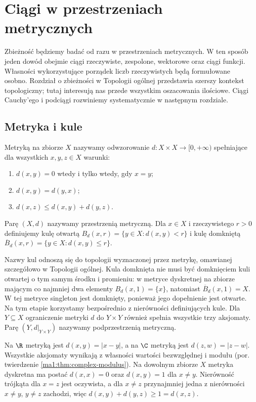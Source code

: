 \chapter{Ciągi w przestrzeniach metrycznych}
\label{ma1:ch:metric-sequences}

Zbieżność będziemy badać od razu w przestrzeniach metrycznych. W ten sposób jeden dowód obejmie ciągi rzeczywiste, zespolone, wektorowe oraz ciągi funkcji. Własności wykorzystujące porządek liczb rzeczywistych będą formułowane osobno. Rozdział o zbieżności w Topologii ogólnej przedstawia szerszy kontekst topologiczny; tutaj interesują nas przede wszystkim oszacowania ilościowe. Ciągi Cauchy'ego i podciągi rozwiniemy systematycznie w następnym rozdziale.

\section{Metryka i kule}
\begin{definicja}
\label{ma1:def:metric}
Metryką na zbiorze $X$ nazywamy odwzorowanie $d:X\times X\to[0,+\infty)$ spełniające dla wszystkich $x,y,z\in X$ warunki:
\begin{enumerate}[label=(\roman*)]
\item $d(x,y)=0$ wtedy i tylko wtedy, gdy $x=y$;
\item $d(x,y)=d(y,x)$;
\item $d(x,z)\le d(x,y)+d(y,z)$.
\end{enumerate}
Parę $(X,d)$ nazywamy przestrzenią metryczną. Dla $x\in X$ i rzeczywistego $r>0$ definiujemy kulę otwartą $B_d(x,r)=\{y\in X:d(x,y)<r\}$ i kulę domkniętą $\overline B_d(x,r)=\{y\in X:d(x,y)\le r\}$.
\end{definicja}
Nazwy kul odnoszą się do topologii wyznaczonej przez metrykę, omawianej szczegółowo w Topologii ogólnej. Kula domknięta nie musi być domknięciem kuli otwartej o tym samym środku i promieniu: w metryce dyskretnej na zbiorze mającym co najmniej dwa elementy $B_d(x,1)=\{x\}$, natomiast $\overline B_d(x,1)=X$. W tej metryce singleton jest domknięty, ponieważ jego dopełnienie jest otwarte. Na tym etapie korzystamy bezpośrednio z nierówności definiujących kule. Dla $Y\subseteq X$ ograniczenie metryki $d$ do $Y\times Y$ również spełnia wszystkie trzy aksjomaty. Parę $(Y,d|_{Y\times Y})$ nazywamy podprzestrzenią metryczną.

\begin{przyklad}
\label{ma1:ex:basic-metrics}
Na $\R$ metryką jest $d(x,y)=|x-y|$, a na $\C$ metryką jest $d(z,w)=|z-w|$. Wszystkie aksjomaty wynikają z własności wartości bezwzględnej i modułu (por. twierdzenie \ref{ma1:thm:complex-modulus}).
Na dowolnym zbiorze $X$ metryka dyskretna ma postać $d(x,x)=0$ oraz $d(x,y)=1$ dla $x\ne y$. Nierówność trójkąta dla $x=z$ jest oczywista, a dla $x\ne z$ przynajmniej jedna z nierówności $x\ne y$, $y\ne z$ zachodzi, więc $d(x,y)+d(y,z)\ge1=d(x,z)$.
\end{przyklad}

